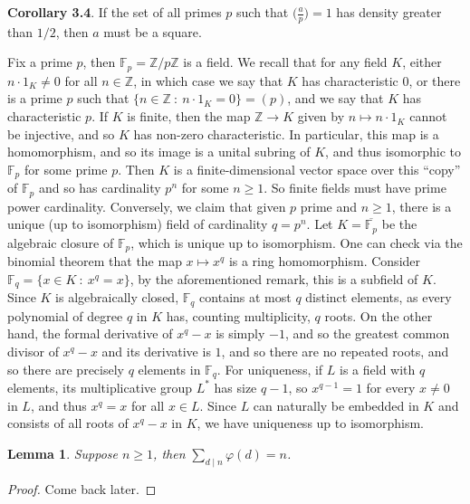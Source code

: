 \documentclass[12pt]{article}
\newcommand{\ints}{\mathbb{Z}}
\newcommand{\intsmod}[1]{\ints / #1 \ints}
\newtheorem{lemma}{Lemma}
\numberwithin{equation}{section}
\numberwithin{thm}{section}
\numberwithin{lemma}{section}
\numberwithin{cor}{section}
\begin{document}
\textbf{Corollary 3.4}. If the set of all primes $p$ such that $\big( \frac{a}{p} \big) = 1$ has density greater than $1/2$, then $a$ must be a square.

Fix a prime $p$, then $\mathbb{F}_p = \intsmod{p}$ is a field. We recall that for any field $K$, either $n \cdot 1_K \ne 0$ for all $n \in \ints$, in which case we say that $K$ has characteristic $0$, or there is a prime $p$ such that $\{ n \in \ints \ : \ n \cdot 1_K = 0 \} = (p)$, and we say that $K$ has characteristic $p$. If $K$ is finite, then the map $\ints \to K$ given by $n \mapsto n \cdot 1_K$ cannot be injective, and so $K$ has non-zero characteristic. In particular, this map is a homomorphism, and so its image is a unital subring of $K$, and thus isomorphic to $\mathbb{F}_p$ for some prime $p$. Then $K$ is a finite-dimensional vector space over this ``copy'' of $\mathbb{F}_p$ and so has cardinality $p^n$ for some $n \geq 1$. So finite fields must have prime power cardinality. Conversely, we claim that given $p$ prime and $n \geq 1$, there is a unique (up to isomorphism) field of cardinality $q = p^n$. Let $K = \overline{\mathbb{F}_p}$ be the algebraic closure of $\mathbb{F}_p$, which is unique up to isomorphism. One can check via the binomial theorem that the map $x \mapsto x^q$ is a ring homomorphism. Consider $\mathbb{F}_q = \{ x \in K \ : \ x^q = x \}$, by the aforementioned remark, this is a subfield of $K$. Since $K$ is algebraically closed, $\mathbb{F}_q$ contains at most $q$ distinct elements, as every polynomial of degree $q$ in $K$ has, counting multiplicity, $q$ roots. On the other hand, the formal derivative of $x^q - x$ is simply $-1$, and so the greatest common divisor of $x^q-x$ and its derivative is $1$, and so there are no repeated roots, and so there are precisely $q$ elements in $\mathbb{F}_q$. For uniqueness, if $L$ is a field with $q$ elements, its multiplicative group $L^*$ has size $q-1$, so $x^{q-1} = 1$ for every $x\ne0$ in $L$, and thus $x^q = x$ for all $x \in L$. Since $L$ can naturally be embedded in $K$ and consists of all roots of $x^q - x$ in $K$, we have uniqueness up to isomorphism.

\begin{lemma}\label{SumOfTotient}
  Suppose $n \geq 1$, then $\sum_{d \mid n} \varphi(d) = n$.
\end{lemma}
\begin{proof}
  Come back later.
\end{proof}
\end{document}

